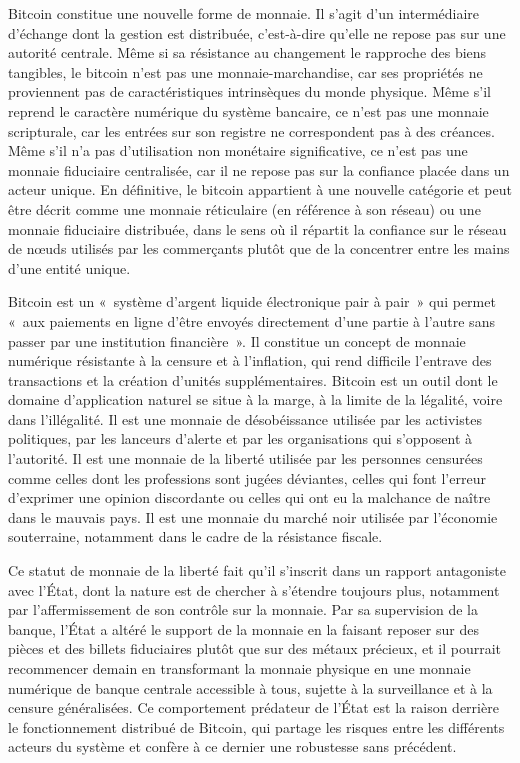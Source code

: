 Bitcoin constitue une nouvelle forme de monnaie. Il s'agit d'un intermédiaire d'échange dont la gestion est distribuée, c'est-à-dire qu'elle ne repose pas sur une autorité centrale. Même si sa résistance au changement le rapproche des biens tangibles, le bitcoin n'est pas une monnaie-marchandise, car ses propriétés ne proviennent pas de caractéristiques intrinsèques du monde physique. Même s'il reprend le caractère numérique du système bancaire, ce n'est pas une monnaie scripturale, car les entrées sur son registre ne correspondent pas à des créances. Même s'il n'a pas d'utilisation non monétaire significative, ce n'est pas une monnaie fiduciaire centralisée, car il ne repose pas sur la confiance placée dans un acteur unique. En définitive, le bitcoin appartient à une nouvelle catégorie et peut être décrit comme une monnaie réticulaire (en référence à son réseau) ou une monnaie fiduciaire distribuée, dans le sens où il répartit la confiance sur le réseau de nœuds utilisés par les commerçants plutôt que de la concentrer entre les mains d'une entité unique.

Bitcoin est un «~système d'argent liquide électronique pair à pair~» qui permet «~aux paiements en ligne d'être envoyés directement d'une partie à l'autre sans passer par une institution financière~». Il constitue un concept de monnaie numérique résistante à la censure et à l'inflation, qui rend difficile l'entrave des transactions et la création d'unités supplémentaires. Bitcoin est un outil dont le domaine d'application naturel se situe à la marge, à la limite de la légalité, voire dans l'illégalité. Il est une monnaie de désobéissance utilisée par les activistes politiques, par les lanceurs d'alerte et par les organisations qui s'opposent à l'autorité. Il est une monnaie de la liberté utilisée par les personnes censurées comme celles dont les professions sont jugées déviantes, celles qui font l'erreur d'exprimer une opinion discordante ou celles qui ont eu la malchance de naître dans le mauvais pays. Il est une monnaie du marché noir utilisée par l'économie souterraine, notamment dans le cadre de la résistance fiscale.

Ce statut de monnaie de la liberté fait qu'il s'inscrit dans un rapport antagoniste avec l'État, dont la nature est de chercher à s'étendre toujours plus, notamment par l'affermissement de son contrôle sur la monnaie. Par sa supervision de la banque, l'État a altéré le support de la monnaie en la faisant reposer sur des pièces et des billets fiduciaires plutôt que sur des métaux précieux, et il pourrait recommencer demain en transformant la monnaie physique en une monnaie numérique de banque centrale accessible à tous, sujette à la surveillance et à la censure généralisées. Ce comportement prédateur de l'État est la raison derrière le fonctionnement distribué de Bitcoin, qui partage les risques entre les différents acteurs du système et confère à ce dernier une robustesse sans précédent. %

